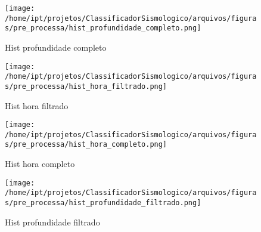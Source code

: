 
    \begin{figure}[H]
        \centering
        \texttt{[image: /home/ipt/projetos/ClassificadorSismologico/arquivos/figuras/pre\_processa/hist\_profundidade\_completo.png]}
        \caption{Hist profundidade completo}
        \label{fig:hist_profundidade_completo}
    \end{figure}
                

    \begin{figure}[H]
        \centering
        \texttt{[image: /home/ipt/projetos/ClassificadorSismologico/arquivos/figuras/pre\_processa/hist\_hora\_filtrado.png]}
        \caption{Hist hora filtrado}
        \label{fig:hist_hora_filtrado}
    \end{figure}
                

    \begin{figure}[H]
        \centering
        \texttt{[image: /home/ipt/projetos/ClassificadorSismologico/arquivos/figuras/pre\_processa/hist\_hora\_completo.png]}
        \caption{Hist hora completo}
        \label{fig:hist_hora_completo}
    \end{figure}
                

    \begin{figure}[H]
        \centering
        \texttt{[image: /home/ipt/projetos/ClassificadorSismologico/arquivos/figuras/pre\_processa/hist\_profundidade\_filtrado.png]}
        \caption{Hist profundidade filtrado}
        \label{fig:hist_profundidade_filtrado}
    \end{figure}
                